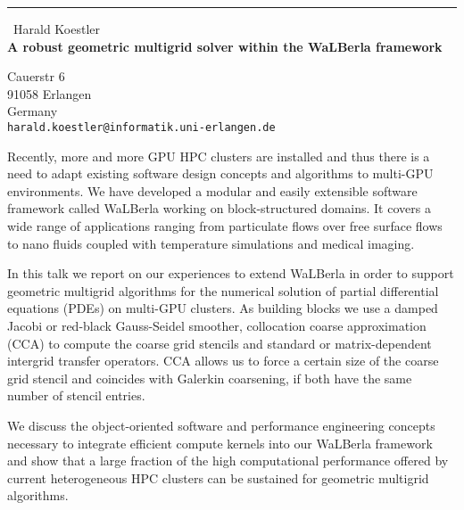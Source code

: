 \documentclass{report}
\begin{document}
\begin{center}
\rule{6in}{1pt} \
{\large Harald Koestler \\
{\bf A robust geometric multigrid solver within the WaLBerla framework}}

Cauerstr 6 \\ 91058 Erlangen \\ Germany
\\
{\tt harald.koestler@informatik.uni-erlangen.de}\end{center}

Recently, more and more GPU HPC clusters are installed and thus there is
a need to adapt existing software design concepts and algorithms to
multi-GPU environments. We have developed a
modular and easily extensible software framework called WaLBerla
working on block-structured domains.
It covers a wide range of applications ranging from particulate flows
over free surface flows to nano fluids coupled with temperature
simulations and medical imaging.

In this talk we report on our experiences to extend WaLBerla in order to
support geometric multigrid algorithms for the numerical solution of
partial differential equations (PDEs) on
multi-GPU clusters. As building blocks we use a damped Jacobi or
red-black Gauss-Seidel smoother,
collocation coarse approximation (CCA) to compute the coarse grid
stencils and standard or matrix-dependent intergrid transfer operators.
CCA allows us to force a certain size of the coarse grid stencil and
coincides with Galerkin coarsening, if both
have the same number of stencil entries.

We discuss the object-oriented software and
performance engineering concepts necessary to integrate efficient compute
kernels into our WaLBerla framework and show that a large fraction of the
high computational performance offered by current heterogeneous HPC
clusters can be sustained for geometric multigrid algorithms.
\end{document}
